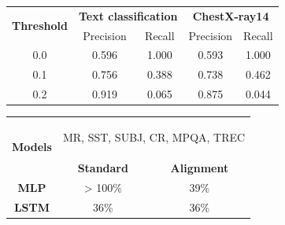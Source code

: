 \begin{table}
\begin{minipage}[t]{.58\textwidth}
	\centering
  \begin{tabular}{c c c c c}
	\toprule
		\multirow{2}{*}{{\bf Threshold}}  & \multicolumn{2}{c}{{\bf Text
		classification}} & \multicolumn{2}{c}{{\bf ChestX-ray14}} \\
		& Precision &  Recall & Precision &  Recall \\
		\cmidrule(lr){1-1} \cmidrule(lr){2-3} \cmidrule(lr){4-5}
		0.0 & 0.596 & 1.000 & 0.593 & 1.000 \\
		0.1 & 0.756 & 0.388 & 0.738 & 0.462 \\
		0.2 & 0.919 & 0.065 & 0.875 & 0.044 \\	
	\bottomrule
	\end{tabular}
	\vspace{0.1in}
	\label{tab:mtl_better_than_stl}
\end{minipage}
\quad
\begin{minipage}[t]{.40\textwidth}
	\centering
	\begin{tabular}{c c c}
		\toprule
		\multirow{2}{*}{{\bf Models}} & \multicolumn{2}{c}{\begin{minipage}{1.1in}\begin{center}
		MR, SST, SUBJ, CR, MPQA, TREC\end{center}\end{minipage}} \\
		\cmidrule(lr){2-3}
		& {\bf Standard} & {\bf Alignment} \\
		\midrule
		{\bf MLP}  & > 100\% & 39\% \\
		{\bf LSTM} & 36\% & 36\% \\
		\bottomrule
		\end{tabular}
	\vspace{0.1in}
	\label{tab:taskonomy}
\end{minipage}
\end{table}

